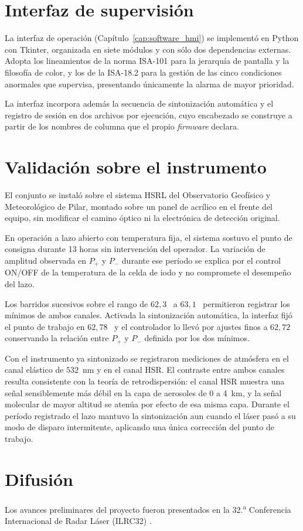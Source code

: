 \section*{Interfaz de supervisión}

La interfaz de operación (Capítulo~\ref{cap:software_hmi}) se implementó en Python
con Tkinter, organizada en siete módulos y con sólo dos dependencias externas. Adopta
los lineamientos de la norma ISA-101 para la jerarquía de pantalla y la filosofía de
color, y los de la ISA-18.2 para la gestión de las cinco condiciones anormales que
supervisa, presentando únicamente la alarma de mayor prioridad.

La interfaz incorpora además la secuencia de sintonización automática y el registro
de sesión en dos archivos por ejecución, cuyo encabezado se construye a partir de los
nombres de columna que el propio \emph{firmware} declara.

\section*{Validación sobre el instrumento}

El conjunto se instaló sobre el sistema HSRL del Observatorio Geofísico y
Meteorológico de Pilar, montado sobre un panel de acrílico en el frente del equipo,
sin modificar el camino óptico ni la electrónica de detección original.

En operación a lazo abierto con temperatura fija, el sistema sostuvo el punto de
consigna durante 13 horas sin intervención del operador. La variación de amplitud
observada en $P_+$ y $P_-$ durante ese período se explica por el control ON/OFF de la
temperatura de la celda de iodo y no compromete el desempeño del lazo.

Los barridos sucesivos sobre el rango de $62{,}3$ \textcelsius\ a
$63{,}1$ \textcelsius\ permitieron registrar los mínimos de ambos canales. Activada la
sintonización automática, la interfaz fijó el punto de trabajo en
$62{,}78$ \textcelsius\ y el controlador lo llevó por ajustes finos a
$62{,}72$ \textcelsius\, conservando la relación entre $P_+$ y $P_-$ definida por los
dos mínimos.

Con el instrumento ya sintonizado se registraron mediciones de atmósfera en el canal
elástico de $532$~nm y en el canal HSR. El contraste entre ambos canales resulta
consistente con la teoría de retrodispersión: el canal HSR muestra una señal
sensiblemente más débil en la capa de aerosoles de 0 a 4~km, y la señal molecular de
mayor altitud se atenúa por efecto de esa misma capa. Durante el período registrado
el lazo mantuvo la sintonización aun cuando el láser pasó a su modo de disparo
intermitente, aplicando una única corrección del punto de trabajo.

\section*{Difusión}

Los avances preliminares del proyecto fueron presentados en la 32.\textsuperscript{a} Conferencia Internacional de Radar Láser (ILRC32)
\cite{galvagno2026ilrc}.
